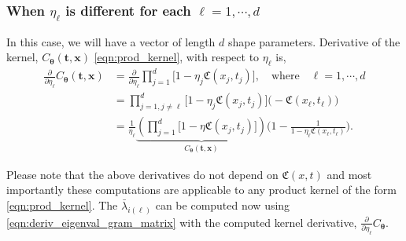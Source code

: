 \documentclass{svjour3}                     %
\newcommand{\bm}[1]{\boldsymbol{#1}}
\newcommand{\vtheta}{{\bm{\theta}}}
\newcommand{\vt}{\bm{t}}
\newcommand{\vx}{\bm{x}}
\begin{document}
\subsubsection{When $\eta_\ell$ is different for each $\ell = 1,\cdots,d$}
In this case, we will have a vector of length $d$ shape parameters. Derivative of the kernel, $C_\vtheta(\vt, \vx)$ \eqref{eqn:prod_kernel}, with respect to $\eta_\ell$ is,
\begin{align*}
\frac{\partial}{\partial \eta_\ell} C_\vtheta(\vt, \vx) 
& =
\frac{\partial}{\partial \eta_\ell} 
\prod_{j=1}^d \biggl[
1 - \eta_j \mathfrak{C}(x_j,t_j) \biggr], \quad \text{where} \quad \ell = 1, \cdots, d
\\
& = 
\prod_{j=1, j \neq \ell}^d \biggl[
1 - \eta_j \mathfrak{C}(x_j,t_j) \biggr]
\biggl( - \mathfrak{C}(x_\ell,t_\ell) \biggr)
\\
& =
\frac{1}{\eta_\ell} 
\underbrace{
	\left(
	\prod_{j=1}^d \biggl[
	1 - \eta \mathfrak{C}(x_j,t_j) \biggr]
	\right) }_
{ C_\vtheta(\vt, \vx) }
\biggl(
1 - 
\frac{1}
{ 1 - \eta_\ell \mathfrak{C}(x_\ell, t_\ell) }
\biggr) 
.
\end{align*}

Please note that the above derivatives do not depend on $\mathfrak{C}(x,t)$ and most importantly these computations are applicable to any product kernel of the form \eqref{eqn:prod_kernel}.
The $\bar{\lambda}_{i(\ell)}$ can be computed now using \eqref{eqn:deriv_eigenval_gram_matrix} with the computed kernel derivative, $\frac{\partial}{\partial \eta_\ell} C_\vtheta$.
\end{document}
